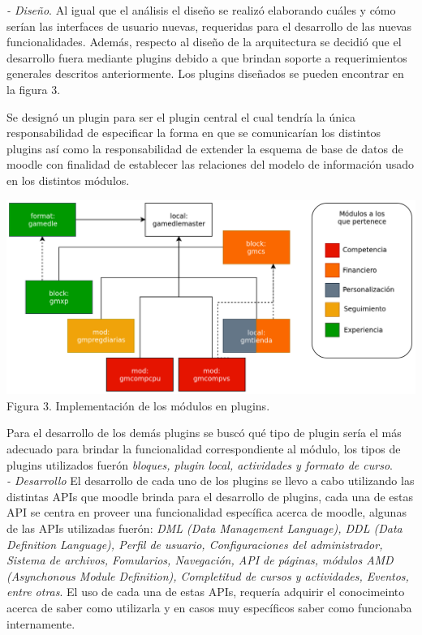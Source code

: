     {\it - Diseño}. Al igual que el análisis el diseño se realizó elaborando cuáles y
    cómo serían las interfaces de usuario nuevas, requeridas para el desarrollo de las
    nuevas funcionalidades. Además, respecto al diseño de la arquitectura se decidió
    que el desarrollo fuera mediante plugins debido a que brindan soporte a
    requerimientos generales descritos anteriormente. Los plugins diseñados se pueden
    encontrar en la figura 3.\par
%
    \noindent
    Se designó un plugin para ser el plugin central el cual tendría la única
    responsabilidad de especificar la forma en que se comunicarían los distintos
    plugins así como la responsabilidad de extender la esquema de base de datos de
    moodle con finalidad de establecer las relaciones del modelo de información usado
    en los distintos módulos.

        \begin{center}
        \includegraphics[width=1\linewidth]{images/plugins}
        \small Figura 3. Implementación de los módulos en plugins.
        \end{center}

    \noindent 
    Para el desarrollo de los demás plugins se buscó qué tipo de plugin sería el más
    adecuado para brindar la funcionalidad correspondiente al módulo, los tipos de
    plugins utilizados fuerón {\it bloques, plugin local, actividades y formato
    de curso}.\\

    {\it - Desarrollo} El desarrollo de cada uno de los plugins se llevo a cabo
    utilizando las distintas APIs que moodle brinda para el desarrollo de plugins, 
    cada una de estas API se centra en proveer una funcionalidad específica acerca
    de moodle, algunas de las APIs utilizadas fuerón: {\it DML (Data Management
    Language), DDL (Data Definition Language), Perfil de usuario, Configuraciones del
    administrador, Sistema de archivos, Fomularios, Navegación, API de páginas,
    módulos AMD (Asynchonous Module Definition), Completitud de cursos y actividades, 
    Eventos, entre otras}. El uso de cada una de estas APIs, requería adquirir el
    conocimeinto acerca de saber como utilizarla y en casos muy específicos saber como
    funcionaba internamente.\\

